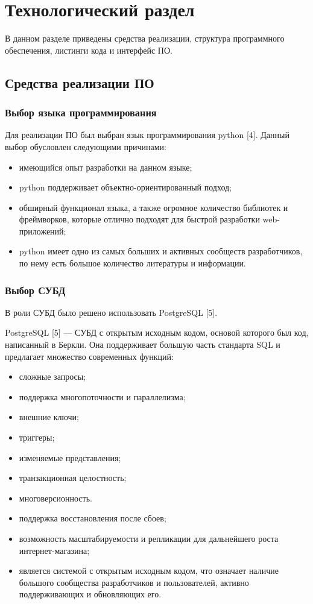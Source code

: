 \chapter{Технологический раздел}

В данном разделе приведены средства реализации, структура программного обеспечения, листинги кода и интерфейс ПО.

\section{Средства реализации ПО}

\subsection{Выбор языка программирования}

Для реализации ПО был выбран язык программирования python [4]. Данный выбор обусловлен следующими причинами:
\begin{itemize}
	\item имеющийся опыт разработки на данном языке;
	\item python поддерживает объектно-ориентированный подход;
	\item обширный функционал языка, а также огромное количество библиотек и фреймворков, которые отлично подходят для быстрой разработки web-приложений;
	\item python имеет одно из самых больших и активных сообществ разработчиков, по нему есть большое количество литературы и информации.
\end{itemize}

\subsection{Выбор СУБД}

В роли СУБД было решено использовать PostgreSQL [5].

PostgreSQL [5] --- СУБД с открытым исходным кодом, основой которого был код, написанный в Беркли. Она поддерживает большую часть стандарта SQL и предлагает множество современных функций:

\begin{itemize}
 \item сложные запросы;
 \item поддержка многопоточности и параллелизма;
 \item внешние ключи;
 \item триггеры;
 \item изменяемые представления;
 \item транзакционная целостность;
 \item многоверсионность.
 \item поддержка восстановления после сбоев;
 \item возможность масштабируемости и репликации для дальнейшего роста интернет-магазина;
 \item является системой с открытым исходным кодом, что означает наличие большого сообщества разработчиков и пользователей, активно поддерживающих и обновляющих его.
\end{itemize}

